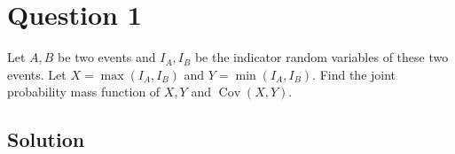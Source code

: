 \section*{Question 1}

Let \( A, B \) be two events and \( I_{A}, I_{B} \) be the indicator random variables of these two events.
Let \( X=\max \left(I_{A}, I_{B}\right) \) and \( Y=\min \left(I_{A}, I_{B}\right) \).
Find the joint probability mass function of \( X, Y \) and \( \operatorname{Cov}(X, Y) \).

\subsection*{Solution}

